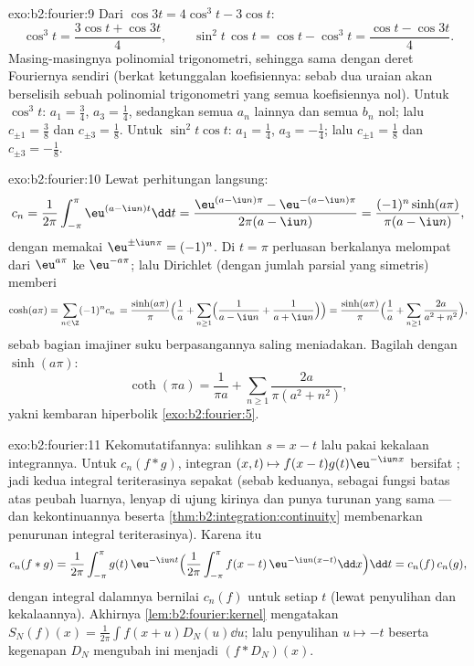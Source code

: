 \begin{solution}{exo:b2:fourier:9}
Dari $\cos 3t = 4\cos^3t - 3\cos t$:
\[
\cos^3 t = \frac{3\cos t + \cos 3t}{4},
\qquad
\sin^2t\,\cos t = \cos t - \cos^3 t
= \frac{\cos t - \cos 3t}{4} .
\]
Masing-masingnya polinomial trigonometri, sehingga sama dengan deret
Fouriernya sendiri (berkat ketunggalan koefisiennya: sebab dua uraian
akan berselisih sebuah polinomial trigonometri yang semua
koefisiennya nol). Untuk $\cos^3t$: $a_1 = \frac34$, $a_3 =
\frac14$, sedangkan semua $a_n$ lainnya dan semua $b_n$ nol; lalu $c_{\pm1} =
\frac38$ dan $c_{\pm3} = \frac18$. Untuk $\sin^2t\cos t$: $a_1 =
\frac14$, $a_3 = -\frac14$; lalu $c_{\pm1} = \frac18$ dan $c_{\pm3} =
-\frac18$.
\end{solution}

\begin{solution}{exo:b2:fourier:10}
Lewat perhitungan langsung:
\[
c_n = \frac{1}{2\pi}\int_{-\pi}^{\pi}\eu^{(a - \iu n)t}\dd t
= \frac{\eu^{(a-\iu n)\pi} - \eu^{-(a - \iu n)\pi}}
{2\pi(a - \iu n)}
= \frac{(-1)^n\sinh(a\pi)}{\pi(a - \iu n)} ,
\]
dengan memakai $\eu^{\pm\iu n\pi} = (-1)^n$. Di $t = \pi$ perluasan
berkalanya melompat dari $\eu^{a\pi}$ ke $\eu^{-a\pi}$; lalu Dirichlet
(dengan jumlah parsial yang simetris) memberi
\[
\cosh(a\pi) = \sum_{n\in\Z}(-1)^n c_n\,
= \frac{\sinh(a\pi)}{\pi}\Bigl(\frac1a +
\sum_{n\geq1}\Bigl(\frac{1}{a - \iu n} +
\frac{1}{a + \iu n}\Bigr)\Bigr)
= \frac{\sinh(a\pi)}{\pi}\Bigl(\frac1a +
\sum_{n\geq1}\frac{2a}{a^2 + n^2}\Bigr) ,
\]
sebab bagian imajiner suku berpasangannya saling meniadakan. Bagilah dengan
$\sinh(a\pi)$:
\[
\coth(\pi a) = \frac{1}{\pi a} +
\sum_{n\geq1}\frac{2a}{\pi(a^2 + n^2)} ,
\]
yakni kembaran hiperbolik \cref{exo:b2:fourier:5}.
\end{solution}

\begin{solution}{exo:b2:fourier:11}
Kekomutatifannya: sulihkan $s = x - t$ lalu pakai kekalaan
integrannya. Untuk $c_n(f * g)$, integran $(x, t) \mapsto
f(x-t)g(t)\eu^{-\iu nx}$ bersifat ; jadi kedua integral
teriterasinya sepakat (sebab keduanya, sebagai fungsi batas atas
peubah luarnya, lenyap di ujung kirinya dan punya turunan yang
sama --- dan kekontinuannya beserta
\cref{thm:b2:integration:continuity} membenarkan penurunan
integral teriterasinya). Karena itu
\[
c_n(f*g) = \frac{1}{2\pi}\int_{-\pi}^{\pi} g(t)\,\eu^{-\iu nt}
\Bigl(\frac{1}{2\pi}\int_{-\pi}^{\pi}
f(x-t)\,\eu^{-\iu n(x-t)}\dd x\Bigr)\dd t
= c_n(f)\,c_n(g),
\]
dengan integral dalamnya bernilai $c_n(f)$ untuk setiap $t$ (lewat penyulihan
dan kekalaannya). Akhirnya \cref{lem:b2:fourier:kernel} mengatakan
$S_N(f)(x) = \frac{1}{2\pi}\int f(x+u)D_N(u)\dd u$; lalu
penyulihan $u \mapsto -t$ beserta kegenapan $D_N$ mengubah ini
menjadi $(f * D_N)(x)$.
\end{solution}

